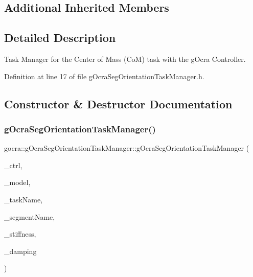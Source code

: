 \subsection*{Additional Inherited Members}


\subsection{Detailed Description}
Task Manager for the Center of Mass (CoM) task with the g\+Ocra Controller. 



Definition at line 17 of file g\+Ocra\+Seg\+Orientation\+Task\+Manager.\+h.



\subsection{Constructor \& Destructor Documentation}
\hypertarget{classgocra_1_1gOcraSegOrientationTaskManager_a4d14922b755ae527247c7c82b1c99cdb}{}\label{classgocra_1_1gOcraSegOrientationTaskManager_a4d14922b755ae527247c7c82b1c99cdb} 
\subsubsection{\texorpdfstring{g\+Ocra\+Seg\+Orientation\+Task\+Manager()}{gOcraSegOrientationTaskManager()}\hspace{0.1cm}{\footnotesize\ttfamily [1/2]}}
{\footnotesize\ttfamily gocra\+::g\+Ocra\+Seg\+Orientation\+Task\+Manager\+::g\+Ocra\+Seg\+Orientation\+Task\+Manager (\begin{DoxyParamCaption}\item[{\hyperlink{classgocra_1_1GHCJTController}{G\+H\+C\+J\+T\+Controller} \&}]{\+\_\+ctrl,  }\item[{const \hyperlink{classocra_1_1Model}{ocra\+::\+Model} \&}]{\+\_\+model,  }\item[{const std\+::string \&}]{\+\_\+task\+Name,  }\item[{const std\+::string \&}]{\+\_\+segment\+Name,  }\item[{double}]{\+\_\+stiffness,  }\item[{double}]{\+\_\+damping }\end{DoxyParamCaption})}

